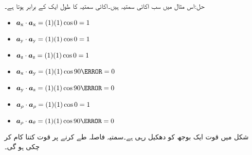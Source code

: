 حل:اس مثال میں سب اکائی سمتیہ ہیں۔اکائی سمتیہ کا طول ایک کے برابر ہوتا ہے۔
\begin{itemize}
\item
${\boldsymbol{a}}_{\textup{x}} \cdot {\boldsymbol{a}}_{\textup{x}} =(1) (1) \cos 0=1$\\
\item
${\boldsymbol{a}}_{\textup{y}} \cdot {\boldsymbol{a}}_{\textup{y}} =(1) (1) \cos 0=1$\\
\item
${\boldsymbol{a}}_{\textup{z}} \cdot {\boldsymbol{a}}_{\textup{z}} =(1) (1) \cos 0=1$\\
\item
$\ax \cdot \ay =(1) (1) \cos 90\degree=0$\\
\item
$\ay \cdot \az =(1) (1) \cos 90\degree=0$\\
\item
${\boldsymbol{a}}_{\rho} \cdot {\boldsymbol{a}}_{\rho} =(1) (1) \cos 0=1$\\
\item
$\arho \cdot \atheta =(1) (1) \cos 90\degree=0$\\
\end{itemize}
%
شکل   میں قوت  ایک بوجھ کو دھکیل رہی ہے۔سمتیہ فاصلہ   طے کرنے پر قوت کتنا کام کر چکی ہو گی۔

